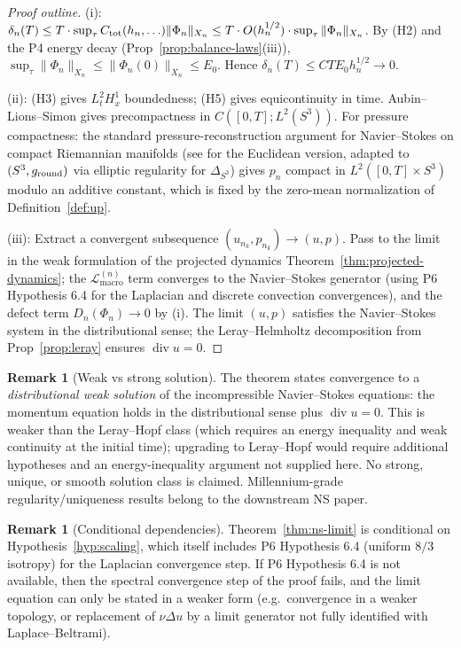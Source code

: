 \documentclass[11pt, a4paper]{amsart}
\theoremstyle{definition}
\newtheorem{remark}[theorem]{Remark}
\newcommand{\Lmacro}{\mathcal L_{\mathrm{macro}}}
\begin{document}
\begin{proof}[Proof outline]
(i): $\delta_n(T) \leq T \cdot \sup_\tau C_{\rm tot}(h_n, \ldots)
\|\Phi_n\|_{X_n} \leq T \cdot O(h_n^{1/2}) \cdot
\sup_\tau \|\Phi_n\|_{X_n}$. By (H2) and the P4 energy decay
(Prop~\ref{prop:balance-laws}(iii)), $\sup_\tau \|\Phi_n\|_{X_n}
\leq \|\Phi_n(0)\|_{X_n} \leq E_0$. Hence $\delta_n(T) \leq
C T E_0 h_n^{1/2} \to 0$.

(ii): (H3) gives $L^2_t H^1_x$ boundedness; (H5) gives
equicontinuity in time. Aubin--Lions--Simon
\cite{SimonCompactness} gives precompactness in
$C([0, T]; L^2(S^3))$. For pressure compactness: the standard
pressure-reconstruction argument for Navier--Stokes on compact
Riemannian manifolds (see \cite[Ch.~II.8]{TemamNS} for the
Euclidean version, adapted to $(S^3, g_{\rm round})$ via
elliptic regularity for $\Delta_{S^3}$) gives $p_n$ compact
in $L^2([0, T] \times S^3)$ modulo an additive constant, which
is fixed by the zero-mean normalization of
Definition~\ref{def:up}.

(iii): Extract a convergent subsequence $(u_{n_k}, p_{n_k}) \to
(u, p)$. Pass to the limit in the weak formulation of the
projected dynamics Theorem~\ref{thm:projected-dynamics}; the
$\Lmacro^{(n)}$ term converges to the Navier--Stokes generator
(using P6 Hypothesis 6.4 for the Laplacian and discrete
convection convergences), and the defect term $D_n(\Phi_n) \to
0$ by (i). The limit $(u, p)$ satisfies the Navier--Stokes
system in the distributional sense; the Leray--Helmholtz
decomposition from Prop~\ref{prop:leray} ensures
$\operatorname{div} u = 0$.
\end{proof}

\begin{remark}[Weak vs strong solution]
\label{rmk:solution-class}
The theorem states convergence to a \emph{distributional weak
solution} of the incompressible Navier--Stokes equations: the
momentum equation holds in the distributional sense plus
$\operatorname{div} u = 0$. This is weaker than the
Leray--Hopf class (which requires an energy inequality and
weak continuity at the initial time); upgrading to Leray--Hopf
would require additional hypotheses and an energy-inequality
argument not supplied here. No strong, unique, or smooth
solution class is claimed. Millennium-grade regularity/uniqueness
results belong to the downstream NS paper.
\end{remark}

\begin{remark}[Conditional dependencies]
\label{rmk:conditional-deps}
Theorem~\ref{thm:ns-limit} is conditional on
Hypothesis~\ref{hyp:scaling}, which itself includes P6
Hypothesis 6.4 (uniform $8/3$ isotropy) for the Laplacian
convergence step. If P6 Hypothesis 6.4 is not available, then
the spectral convergence step of the proof fails, and the limit
equation can only be stated in a weaker form (e.g.\ convergence
in a weaker topology, or replacement of $\nu \Delta u$ by a
limit generator not fully identified with Laplace--Beltrami).
\end{remark}
\end{document}

